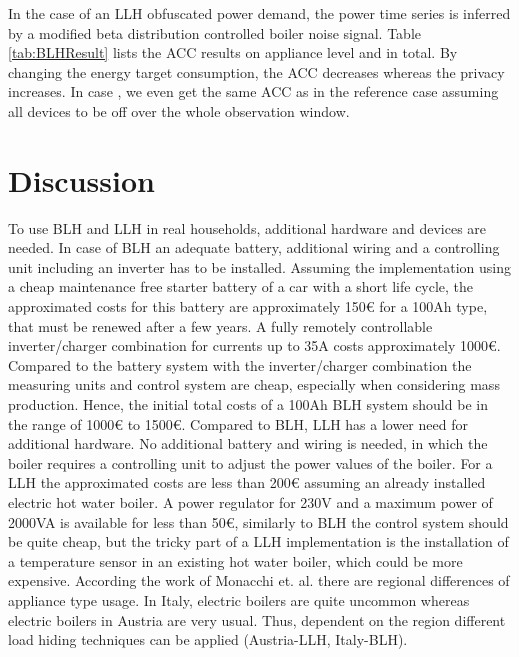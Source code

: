 \documentclass{article}
\begin{document}
In the case of an \ac{LLH} obfuscated power demand, the power time series is inferred by a modified beta distribution controlled boiler noise signal. 
Table \ref{tab:BLHResult} lists the \ac{ACC} results on appliance level and in total.
By changing the energy target consumption, the \ac{ACC} decreases whereas the privacy increases.
In case , we even get the same \ac{ACC} as in the reference case assuming all devices to be off over the whole observation window.




\section{Discussion}\label{sec:discussion}

To use \ac{BLH} and \ac{LLH} in real households, additional hardware and devices are needed.
In case of \ac{BLH} an adequate battery, additional wiring and a controlling unit including an inverter has to be installed. 
Assuming the implementation using a cheap maintenance free starter battery of a car with a short life cycle, the approximated costs for this battery are approximately 150\euro\: for a 100\:Ah type, that must be renewed after a few years. A fully remotely controllable inverter/charger combination for currents up to 35\:A costs approximately 1000\euro\:\cite{Prokop2014}. Compared to the battery system with the inverter/charger combination the measuring units and control system are cheap, especially when considering mass production. Hence, the initial total costs of a 100\:Ah \ac{BLH} system should be in the range of 1000\euro\: to 1500\euro\:\cite{Prokop2014}.
Compared to \ac{BLH}, \ac{LLH} has a lower need for additional hardware.
No additional battery and wiring is needed, in which the boiler requires a controlling unit to adjust the power values of the boiler.
For a \ac{LLH} the approximated costs are less than 200\euro \: assuming an already installed electric hot water boiler. A power regulator for 230\:V and a maximum power of 2000\:VA is available for less than 50\euro, similarly to \ac{BLH} the control system should be quite cheap, but the tricky part of a \ac{LLH} implementation is the installation of a temperature sensor in an existing hot water boiler, which could be more expensive.
According the work of Monacchi et. al. \cite{monacchi2013Nov} there are regional differences of appliance type usage.
In Italy, electric boilers are quite uncommon whereas electric boilers in Austria are very usual. 
Thus, dependent on the region different load hiding techniques can be applied (Austria-\ac{LLH}, Italy-\ac{BLH}). 
\end{document}
